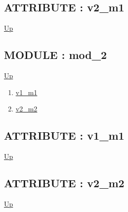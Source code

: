 \subsection*{ATTRIBUTE : v2\_m1}
\hypertarget{ecldoc:example_2.mod_1.v2_m1}{}
\par
\begin{minipage}[t]{\textwidth}
\begin{flushleft}
  
\end{flushleft}
\end{minipage}
\hyperlink{ecldoc:example_2.mod_1}{Up} \\
\par
\par

\subsection*{MODULE : mod\_2}
\hypertarget{ecldoc:example_2.mod_2}{}
\par
\begin{minipage}[t]{\textwidth}
\begin{flushleft}
  
\end{flushleft}
\end{minipage}
\hyperlink{ecldoc:example_2}{Up} \\
\par
\par
\begin{enumerate}
\item \hyperlink{ecldoc:example_2.mod_2.v1_m1}{v1\_m1}
\item \hyperlink{ecldoc:example_2.mod_2.v2_m2}{v2\_m2}
\end{enumerate}
\subsection*{ATTRIBUTE : v1\_m1}
\hypertarget{ecldoc:example_2.mod_2.v1_m1}{}
\par
\begin{minipage}[t]{\textwidth}
\begin{flushleft}
  
\end{flushleft}
\end{minipage}
\hyperlink{ecldoc:example_2.mod_2}{Up} \\
\par
\par
\subsection*{ATTRIBUTE : v2\_m2}
\hypertarget{ecldoc:example_2.mod_2.v2_m2}{}
\par
\begin{minipage}[t]{\textwidth}
\begin{flushleft}
  
\end{flushleft}
\end{minipage}
\hyperlink{ecldoc:example_2.mod_2}{Up} \\
\par
\par

